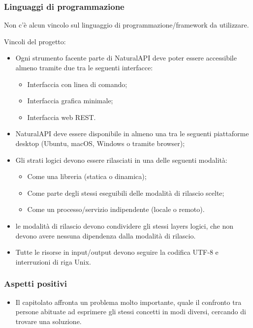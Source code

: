         \subsubsection{Linguaggi di programmazione}
        Non c'è alcun vincolo sul linguaggio di programmazione/framework da utilizzare.
        
Vincoli del progetto:
   	\begin{itemize}
   		\item Ogni strumento facente parte di NaturalAPI deve poter essere accessibile almeno tramite due tra le seguenti interfacce:
   			\begin{itemize}
   				\item Interfaccia con linea di comando;
   				\item Interfaccia grafica minimale;
   				\item Interfaccia web REST.
   			\end{itemize}
   			\item NaturalAPI deve essere disponibile in almeno una tra le seguenti piattaforme desktop (Ubuntu, macOS, Windows o tramite browser);
   			\item Gli strati logici devono essere rilasciati in una delle seguenti modalità:
   				\begin{itemize}
   					\item Come una libreria (statica o dinamica);
   					\item Come parte degli stessi eseguibili delle modalità di rilascio scelte;
   					\item Come un processo/servizio indipendente (locale o remoto).
   				\end{itemize}
   			\item le modalità di rilascio devono condividere gli stessi layers logici, che non devono avere nessuna dipendenza dalla modalità di rilascio.
   			\item Tutte le risorse in input/output devono seguire la codifica UTF-8 e interruzioni di riga Unix.
   	\end{itemize} 
    
    \subsubsection{Aspetti positivi}
    \begin{itemize}
      \item Il capitolato affronta un problema molto importante, quale il confronto tra persone abituate ad esprimere gli stessi concetti in modi diversi, cercando di trovare una soluzione. 
    \end{itemize}

